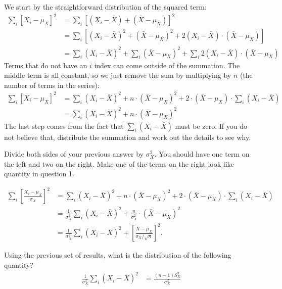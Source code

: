 
We start by the straightforward
distribution of the squared term:
\begin{align*}
\sum_i \left[ X_i - \mu_X \right]^2 &= \sum_i \left[ (X_i - \bar{X}) + (\bar{X} - \mu_X) \right]^2 \\
&= \sum_i \left[ (X_i - \bar{X})^2 + (\bar{X} - \mu_X)^2 + 2 (X_i - \bar{X}) \cdot (\bar{X} - \mu_X) \right] \\
&= \sum_i (X_i - \bar{X})^2 + \sum_i (\bar{X} - \mu_X)^2 + \sum_i 2 (X_i - \bar{X}) \cdot (\bar{X} - \mu_X)
\end{align*}
Terms that do not have an $i$ index can come outside of the summation. The middle
term is all constant, so we just remove the sum by multiplying by $n$ (the number
of terms in the series):
\begin{align*}
\sum_i \left[ X_i - \mu_X \right]^2 
&= \sum_i (X_i - \bar{X})^2 + n \cdot (\bar{X} - \mu_X)^2 + 2 \cdot (\bar{X} - \mu_X) \cdot \sum_i  (X_i - \bar{X}) \\
&= \sum_i (X_i - \bar{X})^2 + n \cdot (\bar{X} - \mu_X)^2
\end{align*}
The last step comes from the fact that $\sum_i (X_i - \bar{X})$ must be zero. If
you do not believe that, distribute the summation and work out the details to see
why. 


Divide both sides of your previous answer by $\sigma_X^2$. You
should have one term on the left and two on the right. Make one of the terms
on the right look like quantity in question 1.


\begin{align*}
\sum_i \left[ \frac{X_i - \mu_X}{\sigma_X} \right]^2 
&= \sum_i (X_i - \bar{X})^2 + n \cdot (\bar{X} - \mu_X)^2 + 2 \cdot (\bar{X} - \mu_X) \cdot \sum_i  (X_i - \bar{X}) \\
&= \frac{1}{\sigma_X^2} \sum_i (X_i - \bar{X})^2 + \frac{n}{\sigma_X^2} \cdot (\bar{X} - \mu_X)^2 \\
&= \frac{1}{\sigma_X^2} \sum_i (X_i - \bar{X})^2 + \left[\frac{\bar{X} - \mu_X}{\sigma_X / \sqrt{n}} \right]^2.
\end{align*}


Using the previous set of results, what is the distribution of
the following quantity?
\begin{align*}
\frac{1}{\sigma_X^2} \sum_i (X_i - \bar{X})^2 &= \frac{(n-1) S_X^2}{\sigma_X^2}
\end{align*}

